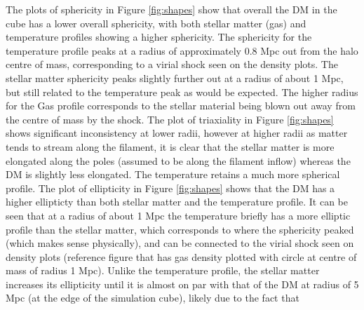 \documentclass[journal]{IEEEtran}
\begin{document}
The plots of sphericity in Figure \ref{fig:shapes} show that overall the DM in the cube has a lower overall sphericity, with both stellar matter (gas) and temperature profiles showing a higher sphericity. The sphericity for the temperature profile peaks at a radius of approximately 0.8 Mpc out from the halo centre of mass, corresponding to a virial shock seen on the density plots. The stellar matter sphericity peaks slightly further out at a radius of about 1 Mpc, but still related to the temperature peak as would be expected. The higher radius for the Gas profile corresponds to the stellar material being blown out away from the centre of mass by the shock. 
The plot of triaxiality in Figure \ref{fig:shapes} shows significant inconsistency at lower radii, however at higher radii as matter tends to stream along the filament, it is clear that the stellar matter is more elongated along the poles (assumed to be along the filament inflow) whereas the DM is slightly less elongated. The temperature retains a much more spherical profile.
The plot of ellipticity in Figure \ref{fig:shapes} shows that the DM has a higher ellipticty than both stellar matter and the temperature profile. It can be seen that at a radius of about 1 Mpc the temperature briefly has a more elliptic profile than the stellar matter, which corresponds to where the sphericity peaked (which makes sense physically), and can be connected to the virial shock seen on density plots (reference figure that has gas density plotted with circle at centre of mass of radius 1 Mpc). Unlike the temperature profile, the stellar matter increases its ellipticity until it is almost on par with that of the DM at radius of 5 Mpc (at the edge of the simulation cube), likely due to the fact that 
\end{document}

